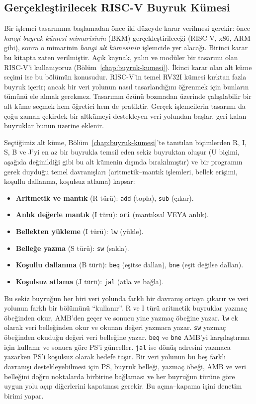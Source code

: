 \subsection{Gerçekleştirilecek RISC-V Buyruk Kümesi}
\label{subsec:riscv-buyruk-kumesi}

Bir işlemci tasarımına başlamadan önce iki düzeyde karar verilmesi gerekir: önce \emph{hangi buyruk kümesi mimarisinin} (BKM) gerçekleştirileceği (RISC-V, x86, ARM gibi), sonra o mimarinin \emph{hangi alt kümesinin} işlemcide yer alacağı. Birinci karar bu kitapta zaten verilmiştir. Açık kaynak, yalın ve modüler bir tasarımı olan RISC-V'i kullanıyoruz (Bölüm~\ref{chap:buyruk-kumesi}). İkinci karar olan alt küme seçimi ise bu bölümün konusudur. RISC-V'in temel RV32I kümesi kırktan fazla buyruk içerir; ancak bir veri yolunun nasıl tasarlandığını öğrenmek için bunların tümünü ele almak gerekmez. Tasarımın özünü bozmadan üzerinde çalışılabilir bir alt küme seçmek hem öğretici hem de pratiktir. Gerçek işlemcilerin tasarımı da çoğu zaman çekirdek bir altkümeyi destekleyen veri yolundan başlar, geri kalan buyruklar bunun üzerine eklenir.

Seçtiğimiz alt küme, Bölüm~\ref{chap:buyruk-kumesi}'te tanıtılan biçimlerden R, I, S, B ve J'yi en az bir buyrukla temsil eden sekiz buyruktan oluşur (U biçimi, aşağıda değinildiği gibi bu alt kümenin dışında bırakılmıştır) ve bir programın gerek duyduğu temel davranışları (aritmetik--mantık işlemleri, bellek erişimi, koşullu dallanma, koşulsuz atlama) kapsar:

\begin{itemize}
    \item \textbf{Aritmetik ve mantık} (R türü): \texttt{add} (topla), \texttt{sub} (çıkar).
    \item \textbf{Anlık değerle mantık} (I türü): \texttt{ori} (mantıksal VEYA anlık).
    \item \textbf{Bellekten yükleme} (I türü): \texttt{lw} (yükle).
    \item \textbf{Belleğe yazma} (S türü): \texttt{sw} (sakla).
    \item \textbf{Koşullu dallanma} (B türü): \texttt{beq} (eşitse dallan), \texttt{bne} (eşit değilse dallan).
    \item \textbf{Koşulsuz atlama} (J türü): \texttt{jal} (atla ve bağla).
\end{itemize}

Bu sekiz buyruğun her biri veri yolunda farklı bir davranış ortaya çıkarır ve veri yolunun farklı bir bölümünü ``kullanır''. R ve I türü aritmetik buyruklar yazmaç öbeğinden okur, AMB'den geçer ve sonucu yine yazmaç öbeğine yazar. \texttt{lw} ek olarak veri belleğinden okur ve okunan değeri yazmaca yazar. \texttt{sw} yazmaç öbeğinden okuduğu değeri veri belleğine yazar. \texttt{beq} ve \texttt{bne} AMB'yi karşılaştırma için kullanır ve sonuca göre PS'i günceller. \texttt{jal} ise dönüş adresini yazmaca yazarken PS'i koşulsuz olarak hedefe taşır. Bir veri yolunun bu beş farklı davranışı destekleyebilmesi için PS, buyruk belleği, yazmaç öbeği, AMB ve veri belleğini doğru noktalarda birbirine bağlaması ve her buyruğun türüne göre uygun yolu açıp diğerlerini kapatması gerekir. Bu açma--kapama işini denetim birimi yapar.

